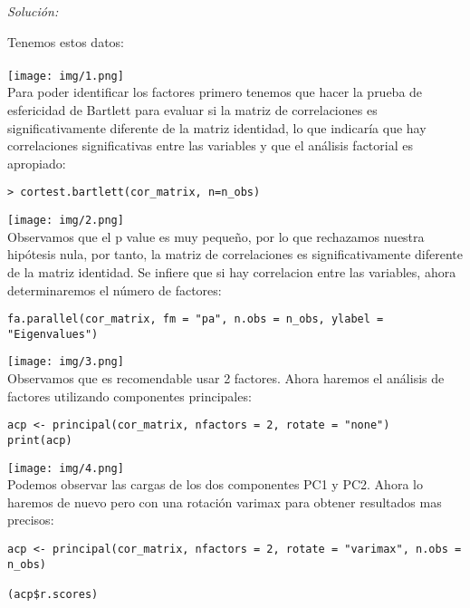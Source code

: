 \documentclass[12pt]{article}
\newenvironment{sol}
    {\emph{Solución:}
    }
    {
    }
\begin{document}
\begin{sol}
Tenemos estos datos:\\\\
\texttt{[image: img/1.png]}\\
Para poder identificar los factores primero tenemos que hacer la prueba de esfericidad de Bartlett para evaluar si la matriz de correlaciones es significativamente diferente de la matriz identidad, lo que indicaría que hay correlaciones significativas entre las variables y que el análisis factorial es apropiado:
\begin{verbatim}
> cortest.bartlett(cor_matrix, n=n_obs)
\end{verbatim}
\texttt{[image: img/2.png]}\\
Observamos que el p value es muy pequeño, por lo que rechazamos nuestra hipótesis nula, por tanto, la matriz de correlaciones es significativamente diferente de la matriz identidad. Se infiere que si hay correlacion entre las variables, ahora determinaremos el número de factores:
\begin{verbatim}
fa.parallel(cor_matrix, fm = "pa", n.obs = n_obs, ylabel = "Eigenvalues")
\end{verbatim}
\texttt{[image: img/3.png]}\\
Observamos que es recomendable usar 2 factores. Ahora haremos el análisis de factores utilizando componentes principales:
\begin{verbatim}
acp <- principal(cor_matrix, nfactors = 2, rotate = "none")
print(acp)
\end{verbatim}
\texttt{[image: img/4.png]}\\
Podemos observar las cargas de los dos componentes PC1 y PC2. Ahora lo haremos de nuevo pero con una rotación varimax para obtener resultados mas precisos:
\begin{verbatim}
acp <- principal(cor_matrix, nfactors = 2, rotate = "varimax", n.obs = n_obs)

(acp$r.scores)


\end{verbatim}
\end{sol}
\end{document}
